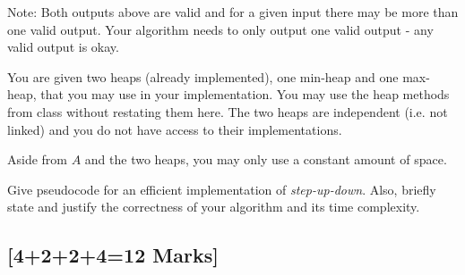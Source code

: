 \documentclass[12pt]{article}
\begin{document}
	\noindent Note: Both outputs above are valid and for a given input there may be more than one valid output. 
	Your algorithm needs to only output one valid output - any valid output is okay.
	
	\bigskip
	
	\noindent You are given two heaps (already implemented), one min-heap and one max-heap, that you may use in your implementation.
	You may use the heap methods from class without restating them here.
	The two heaps are independent (i.e. not linked) and you do not have access to their implementations.
	
	\bigskip
	
	\noindent Aside from $A$ and the two heaps, you may only use a constant amount of space.
	
	\bigskip
	
	\noindent Give pseudocode for an efficient implementation of \emph{step-up-down}.
	Also, briefly state and justify the correctness of your algorithm and its time complexity.
	
	\subsection{[4+2+2+4=12 Marks]}
	
\end{document}
